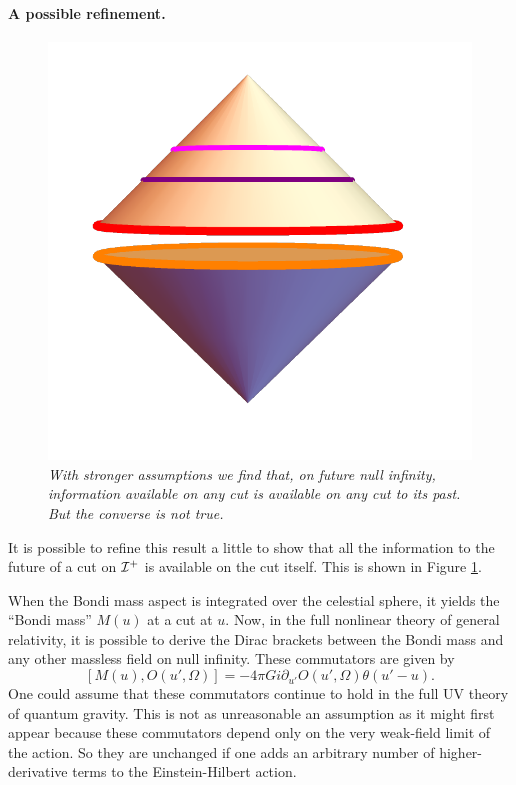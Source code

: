 \documentclass[12pt]{article}
\def\gnewt{G}
\newcommand{\be}{\begin{equation}}
\newcommand{\ee}{\end{equation}}
\def \sph{{\Omega}}
\def \scrip{{\cal I}^{+}}
\begin{document}
\paragraph{\bf A possible refinement. \\}
\begin{figure}[!ht]
\begin{center}
\includegraphics[height=0.5\textheight]{bdrynullwithcuts.pdf}
\caption{\em With stronger assumptions we find that, on future null infinity, information available on any cut is available on any cut to its past. But the converse is not true. \label{cutinfo}}
\end{center}
\end{figure}
It is possible to refine this result a little to show that all the information to the future of a cut on $\scrip$ is available on the cut itself. This is shown in Figure \ref{cutinfo}. 

 When the Bondi mass aspect is integrated over the celestial sphere, it yields the ``Bondi mass'' $M(u)$ at a cut at $u$. Now, in the full nonlinear theory of general relativity, it is possible to derive the Dirac brackets between the Bondi mass and any other massless field on null infinity. These commutators are given by
\be
\label{commgr}
[M(u), O(u', \sph)] = -4 \pi \gnewt i  \partial_{u'} O(u', \sph) \theta(u' - u).
\ee
One could assume that these commutators continue to hold in the full UV theory of quantum gravity. This is not as unreasonable an assumption as it might first appear because these commutators depend only on the very weak-field limit of the action. So they are unchanged if one adds an arbitrary number of higher-derivative terms to the Einstein-Hilbert action.
\end{document}
